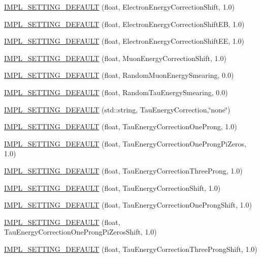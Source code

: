 \begin{DoxyCompactItemize}
\item 
\hyperlink{classHttSettings_a6f23d8103aaea6cdfe90ca7b79ce94a9}{IMPL\_\-SETTING\_\-DEFAULT} (float, ElectronEnergyCorrectionShift, 1.0)
\item 
\hyperlink{classHttSettings_ad23f95a86a7e9281e084669b4293d5d7}{IMPL\_\-SETTING\_\-DEFAULT} (float, ElectronEnergyCorrectionShiftEB, 1.0)
\item 
\hyperlink{classHttSettings_a57dc3006dca1a95598947f28502475cc}{IMPL\_\-SETTING\_\-DEFAULT} (float, ElectronEnergyCorrectionShiftEE, 1.0)
\item 
\hyperlink{classHttSettings_a26c1338e64e048cec7d543ca9ccbf72c}{IMPL\_\-SETTING\_\-DEFAULT} (float, MuonEnergyCorrectionShift, 1.0)
\item 
\hyperlink{classHttSettings_a678dfd913c2204cc5d642301a43756fa}{IMPL\_\-SETTING\_\-DEFAULT} (float, RandomMuonEnergySmearing, 0.0)
\item 
\hyperlink{classHttSettings_a7e16a0445696e88db976f5b6ec6e2cff}{IMPL\_\-SETTING\_\-DEFAULT} (float, RandomTauEnergySmearing, 0.0)
\item 
\hyperlink{classHttSettings_a26b4399da3b83c9a2c2174aad667cb69}{IMPL\_\-SETTING\_\-DEFAULT} (std::string, TauEnergyCorrection,\char`\"{}none\char`\"{})
\item 
\hyperlink{classHttSettings_ae87028c834eae8a541ffa7adb6945f6a}{IMPL\_\-SETTING\_\-DEFAULT} (float, TauEnergyCorrectionOneProng, 1.0)
\item 
\hyperlink{classHttSettings_a990bb76f25ef953b323a1da97df0a42f}{IMPL\_\-SETTING\_\-DEFAULT} (float, TauEnergyCorrectionOneProngPiZeros, 1.0)
\item 
\hyperlink{classHttSettings_a9fc6f8e7febeed96c0e22ae57594b3e3}{IMPL\_\-SETTING\_\-DEFAULT} (float, TauEnergyCorrectionThreeProng, 1.0)
\item 
\hyperlink{classHttSettings_a888c120dedf0435ff3a7cdad154bbf6f}{IMPL\_\-SETTING\_\-DEFAULT} (float, TauEnergyCorrectionShift, 1.0)
\item 
\hyperlink{classHttSettings_a96b8aa1d1077cae74ccf8ad95db1b91e}{IMPL\_\-SETTING\_\-DEFAULT} (float, TauEnergyCorrectionOneProngShift, 1.0)
\item 
\hyperlink{classHttSettings_aa2da7ce271caf09424e162bde62b803c}{IMPL\_\-SETTING\_\-DEFAULT} (float, TauEnergyCorrectionOneProngPiZerosShift, 1.0)
\item 
\hyperlink{classHttSettings_a274ad9b3c532a2893ed7d361d9080892}{IMPL\_\-SETTING\_\-DEFAULT} (float, TauEnergyCorrectionThreeProngShift, 1.0)
\item 

\end{DoxyCompactItemize}
